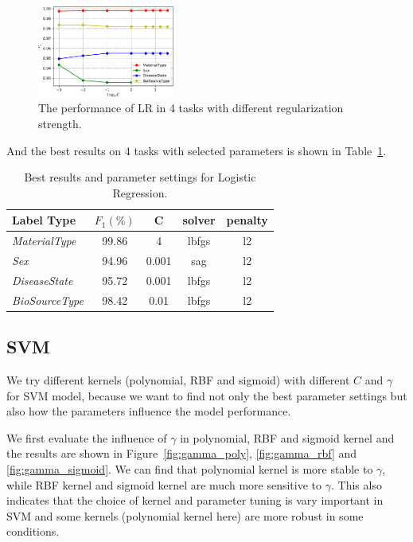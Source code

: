\documentclass[sigconf]{acmart}
\begin{document}
\begin{figure}[!ht]
	\centering
	\includegraphics[width=0.4\textwidth]{../figs/LR_C.pdf}
	\caption{The performance of LR in 4 tasks with different regularization strength.}
	\label{lr_result1}
	\centering
\end{figure}

And the best results on 4 tasks with selected parameters is shown in Table~\ref{lr_result2}.

\begin{table}[tbp]
	\centering
	\begin{tabular}{l|cccc}
		\toprule
		{Label Type} & $F_1 (\%)$ & C &solver &penalty \\
		\midrule
		{\textit{MaterialType}}&99.86 & 4 &lbfgs & l2\\
		{\textit{Sex}}		& 94.96 & 0.001    &sag & l2 \\
		{\textit{DiseaseState}}& 95.72 & 0.001 &lbfgs & l2\\
		{\textit{BioSourceType}}& 98.42 & 0.01 &lbfgs & l2\\
		\bottomrule	
	\end{tabular}
	
	\caption{Best results and parameter settings for Logistic Regression. }
	\label{lr_result2}
\end{table}

\subsection{SVM}
We try different kernels (polynomial, RBF and sigmoid) with different $C$ and $\gamma$ for SVM model, because we want to find not only the best parameter settings but also how the parameters influence the model performance. 

We first evaluate the influence of $\gamma$ in polynomial, RBF and sigmoid kernel and the results are shown in Figure~\ref{fig:gamma_poly}, \ref{fig:gamma_rbf} and \ref{fig:gamma_sigmoid}. We can find that polynomial kernel is more stable to $\gamma$, while RBF kernel and sigmoid kernel are much more sensitive to $\gamma$. This also indicates that the choice of kernel and parameter tuning is vary important in SVM and some kernels (polynomial kernel here) are more robust in some conditions.
\end{document}
